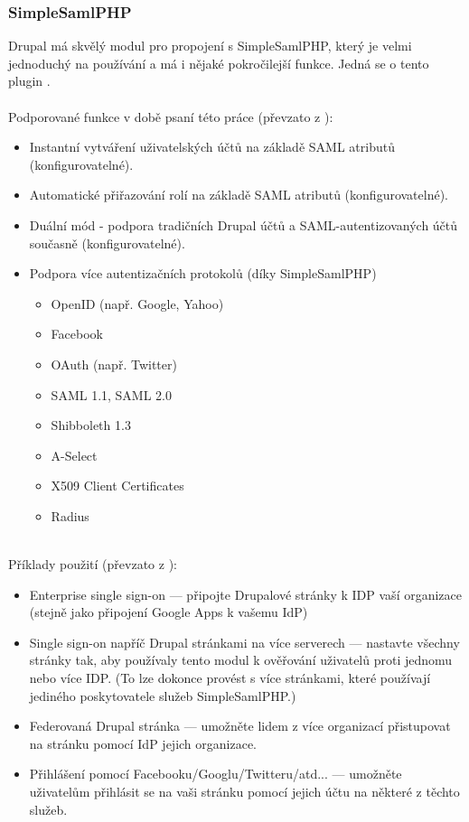\subsubsection{SimpleSamlPHP} %
    Drupal má skvělý modul pro propojení s SimpleSamlPHP, který je velmi jednoduchý na používání a má i nějaké pokročilejší funkce. Jedná se o tento plugin \cite{SimpleSAMLphpDrupal}.
\\ 
\\
     Podporované funkce v době psaní této práce (převzato z \cite{SimpleSAMLphpDrupal}):
    \begin{itemize}
        \item Instantní vytváření uživatelských účtů na základě SAML atributů (konfigurovatelné).
        \item Automatické přiřazování rolí na základě SAML atributů (konfigurovatelné).
        \item Duální mód - podpora tradičních Drupal účtů a SAML-autentizovaných účtů současně (konfigurovatelné).
        \item  Podpora více autentizačních protokolů (díky SimpleSamlPHP)
        \begin{itemize}
            \item OpenID (např. Google, Yahoo)
            \item Facebook
            \item OAuth (např. Twitter)
            \item SAML 1.1, SAML 2.0
            \item Shibboleth 1.3
            \item A-Select
            \item X509 Client Certificates
            \item Radius
        \end{itemize}
    \end{itemize}
    \\
    Příklady použití (převzato z \cite{SimpleSAMLphpDrupal}):
    \begin{itemize}
        \item Enterprise single sign-on --- připojte Drupalové stránky k IDP vaší organizace (stejně jako připojení Google Apps k vašemu IdP)
        \item Single sign-on napříč Drupal stránkami na více serverech --- nastavte všechny stránky tak, aby používaly tento modul k ověřování uživatelů proti jednomu nebo více IDP. (To lze dokonce provést s více stránkami, které používají jediného poskytovatele služeb SimpleSamlPHP.)
        \item Federovaná Drupal stránka --- umožněte lidem z více organizací přistupovat na stránku pomocí IdP jejich organizace.
        \item Přihlášení pomocí Facebooku/Googlu/Twitteru/atd... --- umožněte uživatelům přihlásit se na vaši stránku pomocí jejich účtu na některé z těchto služeb.
    \end{itemize}
    

